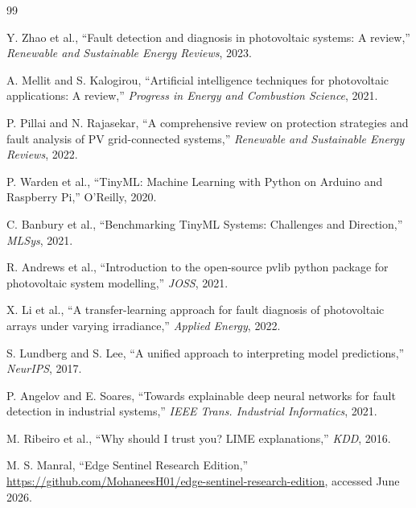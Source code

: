 \documentclass[12pt,journal,onecolumn]{IEEEtran}
\begin{document}
\begin{thebibliography}{99}

Y. Zhao et al., ``Fault detection and diagnosis in photovoltaic systems:
A review,'' \emph{Renewable and Sustainable Energy Reviews}, 2023.

A. Mellit and S. Kalogirou, ``Artificial intelligence techniques for
photovoltaic applications: A review,'' \emph{Progress in Energy and
Combustion Science}, 2021.

P. Pillai and N. Rajasekar, ``A comprehensive review on protection
strategies and fault analysis of PV grid-connected systems,''
\emph{Renewable and Sustainable Energy Reviews}, 2022.

P. Warden et al., ``TinyML: Machine Learning with Python on Arduino and
Raspberry Pi,'' O'Reilly, 2020.

C. Banbury et al., ``Benchmarking TinyML Systems: Challenges and
Direction,'' \emph{MLSys}, 2021.

R. Andrews et al., ``Introduction to the open-source pvlib python package
for photovoltaic system modelling,'' \emph{JOSS}, 2021.

X. Li et al., ``A transfer-learning approach for fault diagnosis of
photovoltaic arrays under varying irradiance,'' \emph{Applied Energy},
2022.

S. Lundberg and S. Lee, ``A unified approach to interpreting model
predictions,'' \emph{NeurIPS}, 2017.

P. Angelov and E. Soares, ``Towards explainable deep neural networks for
fault detection in industrial systems,'' \emph{IEEE Trans. Industrial
Informatics}, 2021.

M. Ribeiro et al., ``Why should I trust you? LIME explanations,''
\emph{KDD}, 2016.

M. S. Manral, ``Edge Sentinel Research Edition,''
\url{https://github.com/MohaneesH01/edge-sentinel-research-edition},
accessed June 2026.

\end{thebibliography}
\end{document}

